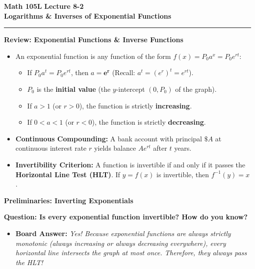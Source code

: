 \documentclass[10.5pt]{article}
\begin{document}
\noindent \textbf{\large Math 105L} \hfill \textbf{\large Lecture 8-2}\\[1pt]
{\textbf{\Large Logarithms \& Inverses of Exponential Functions}}\\[-5pt]
\rule{\textwidth}{1.2pt}

\vspace{0.03in}

\textbf{\large Review: Exponential Functions \& Inverse Functions}

\begin{itemize}[leftmargin=1.2em, topsep=1pt, itemsep=2pt]
  \item An exponential function is any function of the form $f(x) = P_0 a^x = P_0 e^{rt}$:
  \begin{itemize}[label=--]
    \item If $P_0 a^t = P_0 e^{rt}$, then $a = \mathbf{e^r}$ \quad (Recall: $a^t = (e^r)^t = e^{rt}$).
    \item $P_0$ is the \textbf{initial value} (the $y$-intercept $(0, P_0)$ of the graph).
    \item If $a > 1$ (or $r > 0$), the function is strictly \textbf{increasing}.
    \item If $0 < a < 1$ (or $r < 0$), the function is strictly \textbf{decreasing}.
  \end{itemize}
  \item \textbf{Continuous Compounding:} A bank account with principal $\$A$ at continuous interest rate $r$ yields balance $A e^{rt}$ after $t$ years.
  \item \textbf{Invertibility Criterion:} A function is invertible if and only if it passes the \textbf{Horizontal Line Test (HLT)}. If $y = f(x)$ is invertible, then $f^{-1}(y) = x$.
\end{itemize}

\vspace{0.03in}

\textbf{\large Preliminaries: Inverting Exponentials}

\textbf{Question: Is every exponential function invertible? How do you know?}
\begin{itemize}[leftmargin=1.2em, label=$\bullet$, topsep=0pt, itemsep=1pt]
  \item \textbf{Board Answer:} \textit{Yes! Because exponential functions are always strictly monotonic (always increasing or always decreasing everywhere), every horizontal line intersects the graph at most once. Therefore, they always pass the HLT!}
\end{itemize}
\end{document}
